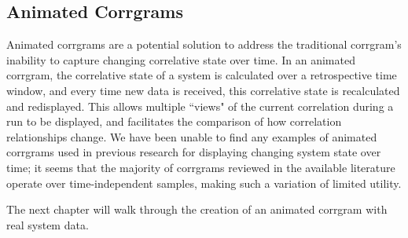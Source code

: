 \subsection{Animated Corrgrams}

Animated corrgrams are a potential solution to address the traditional corrgram's inability to capture changing correlative state over time. In an animated corrgram, the correlative state of a system is calculated over a retrospective time window, and every time new data is received, this correlative state is recalculated and redisplayed. This allows multiple ``views" of the current correlation during a run to be displayed, and facilitates the comparison of how correlation relationships change. We have been unable to find any examples of animated corrgrams used in previous research for displaying changing system state over time; it seems that the majority of corrgrams reviewed in the available literature operate over time-independent samples, making such a variation of limited utility.

The next chapter will walk through the creation of an animated corrgram with real system data.










